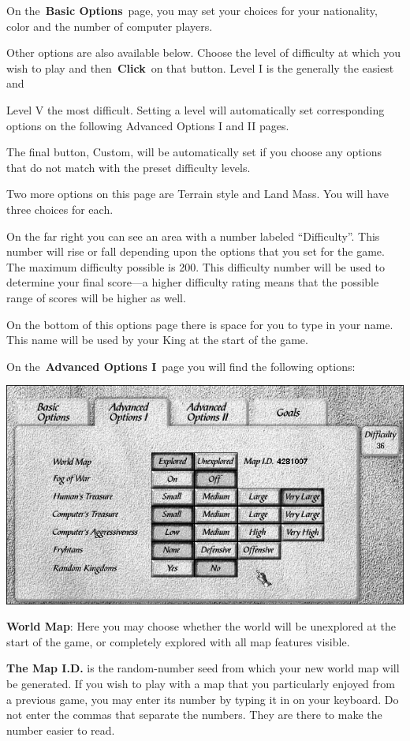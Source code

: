 On the \textbf{Basic Options} page, you may set your choices for your nationality, color and the number of computer players.

Other options are also available below. Choose the level of difficulty at which you wish to play and then \textbf{Click} on that button. Level I is the generally the easiest and 

Level V the most difficult. Setting a level will automatically set corresponding options on the following Advanced Options I and II pages.

The final button, Custom, will be automatically set if you choose any options that do not match with the preset difficulty levels.

Two more options on this page are Terrain style and Land Mass. You will have three choices for each.

On the far right you can see an area with a number labeled “Difficulty”. This number will rise or fall depending upon the options that you set for the game. The maximum difficulty possible is 200. This difficulty number will be used to determine your final score—a higher difficulty rating means that the possible range of scores will be higher as well.

On the bottom of this options page there is space for you to type in your name. This name will be used by your King at the start of the game.

On the \textbf{Advanced Options I} page you will find the following options:

\begin{center}
	\includegraphics[width=0.7\linewidth]{Iadvancedoptions1}
\end{center}

\textbf{World Map}: Here you may choose whether the world will be unexplored at the start of the game, or completely explored with all map features visible.

\begin{adjustwidth}{1cm}{}
 \textbf{The Map I.D.} is the random-number seed from which your new world map will be generated. If you wish to play with a map that you particularly enjoyed from a previous game, you may enter its number by typing it in on your keyboard. Do not enter the commas that separate the numbers. They are there to make the number easier to read.
\end{adjustwidth}

